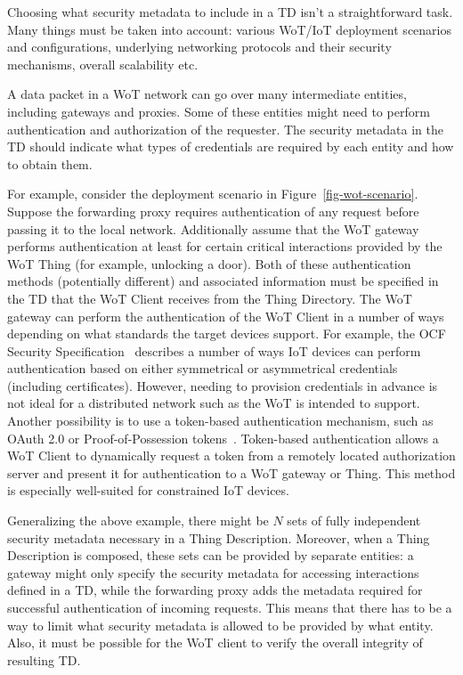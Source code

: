Choosing what security metadata to include in a TD isn't a straightforward task.
Many things must be taken into account: 
various WoT/IoT deployment scenarios and configurations, 
underlying networking protocols and their security mechanisms, overall scalability etc.

A data packet in a WoT network can go over many intermediate entities, including gateways and proxies.
Some of these entities might need to perform authentication 
and authorization of the requester. 
The security metadata in the TD should indicate
what types of credentials are required by each entity and how to obtain them.

For example, consider the deployment scenario in Figure~\ref{fig-wot-scenario}.
Suppose the forwarding proxy requires authentication of any request before passing it to the local network.
Additionally assume that the WoT gateway performs authentication 
at least for certain critical interactions provided by the WoT Thing 
(for example, unlocking a door). 
Both of these authentication methods (potentially different) and 
associated information must be specified in the TD 
that the WoT Client receives from the Thing Directory.
The WoT gateway can perform the authentication of the WoT Client 
in a number of ways depending on what standards the target devices support.
For example, the OCF Security Specification~\cite{ocf2017} 
describes a number of ways IoT devices can perform authentication based on 
either symmetrical or asymmetrical credentials (including certificates). 
However, needing to provision credentials in advance 
is not ideal for a distributed network such as the WoT is intended to support.
Another possibility is to use a token-based authentication mechanism,
such as OAuth 2.0 or Proof-of-Possession tokens~\cite{ace2017}.
Token-based authentication allows  
a WoT Client to dynamically request a token from a remotely 
located authorization server and present it for 
authentication to a WoT gateway or Thing.
This method is especially well-suited for constrained IoT devices. 

Generalizing the above example, 
there might be $N$ sets of fully independent security metadata
necessary in a Thing Description.
Moreover, when a Thing Description is composed, 
these sets can be provided by separate entities: 
a gateway might only specify the security metadata for accessing interactions defined in a TD,
while the forwarding proxy adds the metadata required for successful authentication of incoming requests.
This means that there has to be a way to limit what security metadata 
is allowed to be provided by what entity.
Also, it must be possible for the WoT client to verify the overall integrity of resulting TD. 
 
